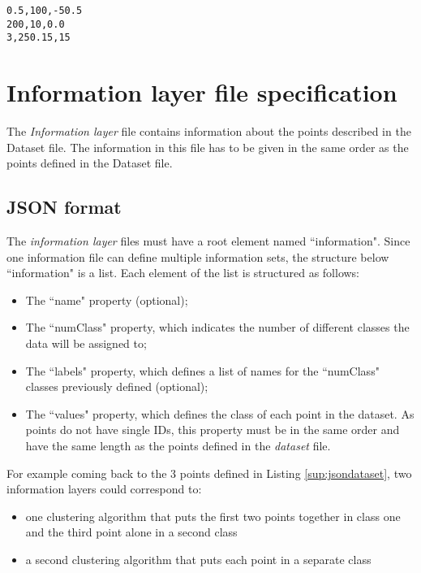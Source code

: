 \begin{lstlisting}[float,caption=CSV dataset file,label=sup:csvdataset]
0.5,100,-50.5
200,10,0.0
3,250.15,15
\end{lstlisting}




\section{Information layer file specification}

The {\it{Information layer}} file contains information about the points described in the Dataset file. The information in this file has to be given in the same order as the points defined in the Dataset file.

		\subsection{JSON format}
The {\it{information layer}} files must have a root element named  ``information". Since one information file can define multiple information sets, the structure below ``information" is a list. Each element of the list is structured as follows:
\begin{itemize}
\item{The ``name" property (optional);}
\item{The ``numClass" property, which indicates the number of different classes the data will be assigned to;}
\item{The ``labels" property, which defines a list of names for the ``numClass" classes previously defined (optional);}
\item{The ``values" property, which defines the class of each point in the dataset. As points do not have single IDs, this property must be in the same order and have the same length as the points defined in the {\it{dataset}} file.}
\end{itemize}

For example coming back to the 3 points defined in Listing \ref{sup:jsondataset}, two information layers could correspond to: 
\begin{itemize}

\item{one clustering algorithm that puts the first two points together in class one and the third point alone in a second class}
\item{a second clustering algorithm that puts each point in a separate class}
\end{itemize}

